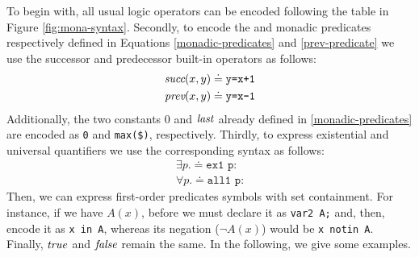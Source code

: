 To begin with, all usual logic operators can be encoded following the table in Figure \ref{fig:mona-syntax}. Secondly, to encode the \suc and \pre monadic predicates respectively defined in Equations \ref{monadic-predicates} and \ref{prev-predicate} we use the successor and predecessor built-in operators as follows:
\begin{align*}
\textit{succ}(x,y) \doteq \texttt{y=x+1}\\
\textit{prev}(x,y) \doteq \texttt{y=x-1}
\end{align*}
Additionally, the two constants $0$ and $\mathit{last}$ already defined in \ref{monadic-predicates} are encoded as \texttt{0} and \texttt{max(\$)}, respectively.
Thirdly, to express existential and universal quantifiers we use the corresponding syntax as follows:
\begin{align*}
\exists p. \doteq \texttt{ex1 p:}\\
\forall p. \doteq \texttt{all1 p:}
\end{align*}
Then, we can express first-order predicates symbols with set containment. For instance, if we have $A(x)$, before we must declare it as \texttt{var2 A;} and, then, encode it as \texttt{x in A}, whereas its negation ($\lnot A(x)$) would be \texttt{x notin A}. Finally, $\mathit{true}$ and $\mathit{false}$ remain the same.
In the following, we give some examples.
